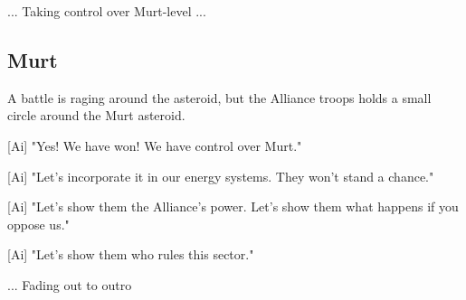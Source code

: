 \documentclass[a4paper,12pt]{article}
\begin{document}
... Taking control over Murt-level ...

\subsection{Murt}

A battle is raging around the asteroid, but the Alliance troops holds a small circle around the Murt asteroid.

[Ai] "Yes! We have won! We have control over Murt."

[Ai] "Let's incorporate it in our energy systems. They won't stand a chance."

[Ai] "Let's show them the Alliance's power. Let's show them what happens if you oppose us."

[Ai] "Let's show them who rules this sector."

... Fading out to outro
\end{document}
